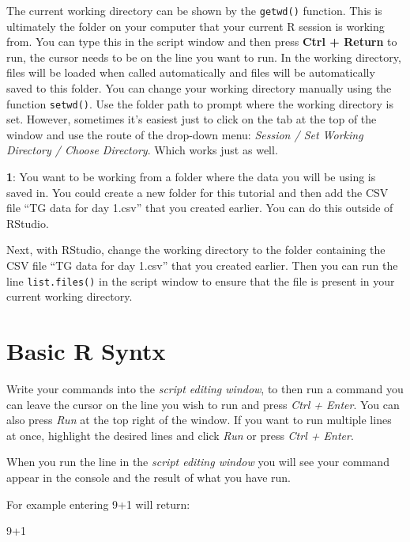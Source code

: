 \documentclass[
]{book}
\makeatletter
\newenvironment{Shaded}{\begin{snugshade}}{\end{snugshade}}
\newcommand{\DecValTok}[1]{\textcolor[rgb]{0.00,0.00,0.81}{#1}}
\newcommand{\SpecialCharTok}[1]{\textcolor[rgb]{0.00,0.00,0.00}{#1}}
\newenvironment{kframe}{%
\medskip{}
\setlength{\fboxsep}{.8em}
 \def\at@end@of@kframe{}%
 \ifinner\ifhmode%
  \def\at@end@of@kframe{\end{minipage}}%
  \begin{minipage}{\columnwidth}%
 \fi\fi%
 \def\FrameCommand##1{\hskip\@totalleftmargin \hskip-\fboxsep
 \colorbox{shadecolor}{##1}\hskip-\fboxsep
     \hskip-\linewidth \hskip-\@totalleftmargin \hskip\columnwidth}%
 \MakeFramed {\advance\hsize-\width
   \@totalleftmargin\z@ \linewidth\hsize
   \@setminipage}}%
 {\par\unskip\endMakeFramed%
 \at@end@of@kframe}
\newenvironment{rmdblock}[1]
  {
  \begin{itemize}
  \renewcommand{\labelitemi}{
    \raisebox{-.7\height}[0pt][0pt]{
      {\setkeys{Gin}{width=3em,keepaspectratio}\texttt{[image: images/\#1]}}
    }
  }
  \setlength{\fboxsep}{1em}
  \begin{kframe}
  \item
  }
  {
  \end{kframe}
  \end{itemize}
  }
\newenvironment{rmdquiz}
  {\begin{rmdblock}{quiz}}
  {\end{rmdblock}}
\makeatother
\begin{document}
The current working directory can be shown by the \texttt{getwd()} function. This is ultimately the folder on your computer that your current R session is working from. You can type this in the script window and then press \textbf{Ctrl + Return} to run, the cursor needs to be on the line you want to run. In the working directory, files will be loaded when called automatically and files will be automatically saved to this folder. You can change your working directory manually using the function \texttt{setwd()}. Use the folder path to prompt where the working directory is set. However, sometimes it's easiest just to click on the tab at the top of the window and use the route of the drop-down menu: \emph{Session / Set Working Directory / Choose Directory}. Which works just as well.

\begin{rmdquiz}
\textbf{1}: You want to be working from a folder where the data you will be using is saved in. You could create a new folder for this tutorial and then add the CSV file ``TG data for day 1.csv'' that you created earlier. You can do this outside of RStudio.

Next, with RStudio, change the working directory to the folder containing the CSV file ``TG data for day 1.csv'' that you created earlier. Then you can run the line \texttt{list.files()} in the script window to ensure that the file is present in your current working directory.
\end{rmdquiz}

\hypertarget{basic-r-syntx}{%
\section{Basic R Syntx}\label{basic-r-syntx}}

Write your commands into the \emph{script editing window}, to then run a command you can leave the cursor on the line you wish to run and press \emph{Ctrl + Enter}. You can also press \emph{Run} at the top right of the window. If you want to run multiple lines at once, highlight the desired lines and click \emph{Run} or press \emph{Ctrl + Enter}.

When you run the line in the \emph{script editing window} you will see your command appear in the console and the result of what you have run.

For example entering 9+1 will return:

\begin{Shaded}
\begin{Highlighting}[]
\DecValTok{9}\SpecialCharTok{+}\DecValTok{1}
\end{Highlighting}
\end{Shaded}
\end{document}
